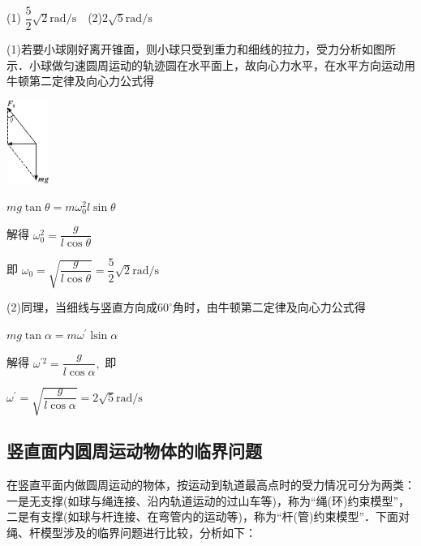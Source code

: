 \documentclass[cn,10.5pt,chinese,mac,chinesefont=founder]{elegantbook}
\begin{document}
\begin{solution}(1) $\dfrac{5}{2} \sqrt{2} \mathrm{rad} / \mathrm{s}$　(2)$2 \sqrt{5} \mathrm{rad} / \mathrm{s}$

	(1)若要小球刚好离开锥面，则小球只受到重力和细线的拉力，受力分析如图所示．小球做匀速圆周运动的轨迹圆在水平面上，故向心力水平，在水平方向运动用牛顿第二定律及向心力公式得

\begin{center}\includegraphics[width=0.55in,height=1.06667in]{media/image186.png}\end{center}

$m g \tan \theta=m \omega_{0}^{2} l \sin \theta$

解得 $\omega_{0}^{2}=\dfrac{g}{l \cos \theta}$

即 $\omega_{0}=\sqrt{\dfrac{g}{l \cos \theta}}=\dfrac{5}{2} \sqrt{2} \mathrm{rad} / \mathrm{s}$

(2)同理，当细线与竖直方向成$60^\circ$角时，由牛顿第二定律及向心力公式得

$mg\tan \alpha=m \omega^{\prime} \operatorname{lsin} \alpha$

解得 $\omega^{\prime 2}=\dfrac{g}{l \cos \alpha},$ 即

$\omega^{\prime}=\sqrt{\dfrac{g}{l \cos \alpha}}=2 \sqrt{5} \mathrm{rad} / \mathrm{s}$
\end{solution}
\newpage
\subsection{竖直面内圆周运动物体的临界问题}

在竖直平面内做圆周运动的物体，按运动到轨道最高点时的受力情况可分为两类：一是无支撑(如球与绳连接、沿内轨道运动的过山车等)，称为``绳(环)约束模型''，二是有支撑(如球与杆连接、在弯管内的运动等)，称为``杆(管)约束模型''．下面对绳、杆模型涉及的临界问题进行比较，分析如下：
\end{document}
